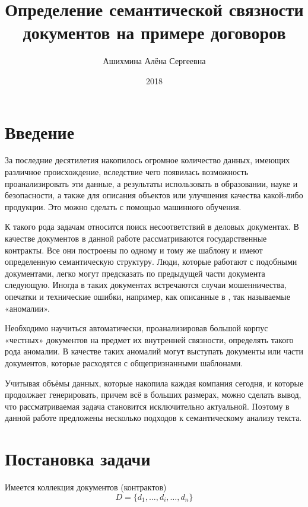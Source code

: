 \documentclass[12pt]{article}
\author{Ашихмина Алёна Сергеевна}
\title{Определение семантической связности \\ документов на примере договоров}
\date{2018}
\begin{document}
\maketitle{}

\topmargin=-1cm
\setlength{\textheight}{20,8cm}
\setlength{\textwidth}{16.5cm}
\hoffset=-5mm
\voffset=10mm
\parindent=12mm

\newpage
\tableofcontents
\newpage



\section{Введение}
За последние десятилетия накопилось огромное количество данных, имеющих различное происхождение, вследствие чего появилась возможность проанализировать эти данные, а результаты использовать в образовании, науке и безопасности, а также для описания объектов или улучшения качества какой-либо продукции. Это можно сделать с помощью машинного обучения. 

К такого рода задачам относится поиск несоответствий в деловых документах. В качестве документов в данной работе рассматриваются государственные контракты. Все они построены по одному и тому же шаблону и имеют определенную семантическую структуру. Люди, которые работают с подобными документами, легко могут предсказать по предыдущей части документа следующую. Иногда в таких документах встречаются случаи мошенничества, опечатки и технические ошибки, например, как описанные в \cite{vedomosti,fontanka}, так называемые «аномалии». 

Необходимо научиться автоматически, проанализировав большой корпус «честных» документов на предмет их внутренней связности, определять такого рода аномалии. В качестве таких аномалий могут выступать документы или части документов, которые расходятся с общепризнанными шаблонами.

Учитывая объёмы данных, которые накопила каждая компания сегодня, и которые продолжает генерировать, причем всё в больших размерах, можно сделать вывод, что рассматриваемая задача становится исключительно актуальной. Поэтому в данной работе предложены несколько подходов к семантическому анализу текста. 

\newpage
\section{Постановка задачи}
Имеется коллекция документов (контрактов) $$D = \{d_1,\ldots,d_i,\ldots,d_n\}$$
\end{document}
